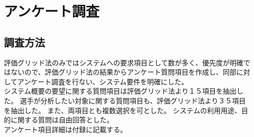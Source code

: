 \documentclass[sotsuron]{kuee}
\begin{document}
\section{アンケート調査}
\subsection{調査方法}
評価グリッド法のみではシステムへの要求項目として数が多く、優先度が明確ではないので、評価グリッド法の結果からアンケート質問項目を作成し、同部に対してアンケート調査を行ない、システム要件を明確にした。
\\システム概要の要望に関する質問項目は評価グリッド法より１５項目を抽出した。
選手が分析したい対象に関する質問項目も、評価グリッド法より３５項目を抽出した。
また、両項目とも複数選択を可とした。
システムの利用用途、目的に関する質問は自由回答とした。
\\アンケート項目詳細は付録に記載する。
\end{document}
